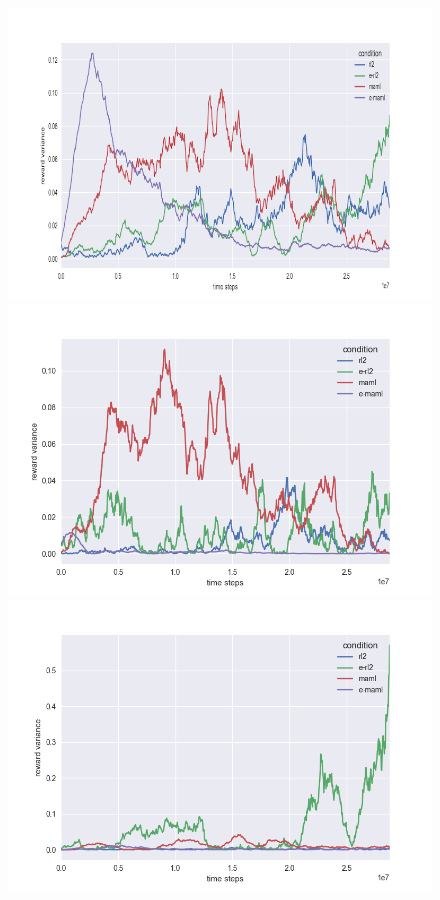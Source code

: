 \begin{figure}[H]
\begin{center}
\includegraphics[scale=0.335]{bradly_curves/64testgridvar0_scaled.png}%
\includegraphics[scale=0.335]{bradly_curves/64testgridvar1.png} \\
\includegraphics[scale=0.335]{bradly_curves/64testgridvar2.png}%

\end{center}
\end{figure}
